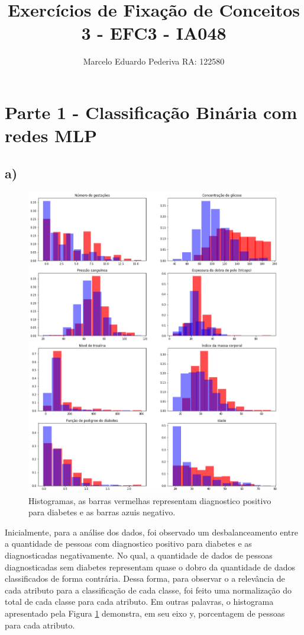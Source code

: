 \documentclass[12pt]{article}
\title{Exercícios de Fixação de Conceitos 3 - EFC3 - IA048}
\author{Marcelo Eduardo Pederiva RA: 122580}
\date{}
\begin{document}
\maketitle
\vfill
\section*{Parte 1 - Classificação Binária com redes MLP}
\subsection*{a)}



\begin{figure}[H]
	\centering
	\includegraphics[width=0.8\linewidth]{Imagens/hist.png}
	\caption{Histogramas, as barras vermelhas representam diagnostico positivo para diabetes e as barras azuis negativo.}
	\label{fig:hist}
\end{figure}


Inicialmente, para a análise dos dados, foi observado um desbalanceamento entre a quantidade de pessoas com diagnostico positivo para diabetes e as diagnosticadas negativamente. No qual, a quantidade de dados de pessoas diagnosticadas sem diabetes representam quase o dobro da quantidade de dados classificados de forma contrária. Dessa forma, para observar o a relevância de cada atributo para a classificação de cada classe, foi feito uma normalização do total de cada classe para cada atributo.  Em outras palavras, o histograma apresentado pela Figura \ref{fig:hist} demonstra, em seu eixo y, porcentagem de pessoas para cada atributo.
\end{document}
